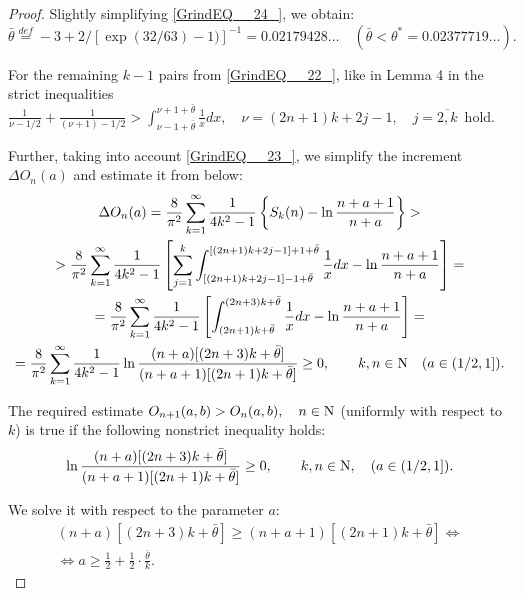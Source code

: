 \documentclass[
11pt,%
tightenlines,%
twoside,%
onecolumn,%
nofloats,%
nobibnotes,%
nofootinbib,%
superscriptaddress,%
noshowpacs,%
centertags]%
{revtex4}
\begin{document}
\begin{proof}
Slightly simplifying \eqref{GrindEQ__24_}, we obtain:
\begin{equation}\label{GrindEQ__25_}
\bar{\theta }\mathop{=}\limits^{def}  - 3 + 2/ [\exp (32/63) -1)]^{-1} = 0.02179428\dots\quad (\bar{\theta } <\theta ^{*} = 0.02377719\dots).
\end{equation}

For the remaining $k-1$ pairs from \eqref{GrindEQ__22_}, like in Lemma 4 in \cite{Sh19} the strict inequalities
$\frac{1}{\nu -1/2} +\frac{1}{(\nu +1)-1/2} > \int _{ \nu -1+ \bar{\theta }}^{\nu +1+\bar{\theta }} \frac{1}{x} dx,\quad \nu =(2n+1)k+2j-1,\quad j=\overline{2, k} \, $ hold.

Further, taking into account \eqref{GrindEQ__23_}, we simplify the increment $\Delta O_{n} (a)$ and estimate it from below:
\begin{multline*}
\Delta O_{n} (a)=  \frac{8}{\pi ^{2} } \sum _{k=1}^{\infty }\frac{1}{4k^{2}  -1}  \left\{S_{k} (n)    -    \ln \frac{n+a+1}{n+a} \right\}   > \\ >
\frac{8}{\pi ^{2} }   \sum _{k=1}^{\infty }\frac{1}{4k^{2}  -  1}   \left[\sum _{j=1}^{k} \int _{ [(2n +1) k +2j-1]  -1 +\bar{\theta }}^{ [(2n +1)k +2j-1] +1+ \bar{\theta }} \frac{1}{x} dx      -   \ln \frac{n+a+1}{n+a} \right]  = \\  = \frac{8}{\pi ^{2} }  \sum _{k=1}^{\infty }\frac{1}{4k^{2}  -  1}   \left[\int _{ (2n +1)k +\bar{\theta }}^{ (2n +3)k  + \bar{\theta }}\frac{1}{x} dx    -   \ln \frac{n+a+1}{n+a} \right]   = \\ =
\frac{8}{\pi ^{2} }  \sum _{k=1}^{\infty }\frac{1}{4k^{2}  -  1}  \ln \frac{(n+a) [(2n+3)k+ \bar{\theta }]}{(n+a+1) [(2n+1)k+  \bar{\theta }]}    \ge   0,    \qquad         k,   n  \in {\rm N}\quad           (a\in (1/2,   1] ) .
\end{multline*}

The required estimate $O_{n +1} (a,  b)   >  O_{n} (a,  b),  \quad     n\in {\rm N}  $ (uniformly with respect to $k$) is true if the following nonstrict inequality holds:
$$
\ln \frac{(n+a)[(2n+3)k+ \bar{\theta }]}{(n+a+1)[(2n+1)k+ \bar{\theta }]}   \ge   0 ,      \qquad      k, n\in {\rm N},   \quad   (a\in (1/2,   1]  ).
$$

We solve it with respect to the parameter $a$:
\begin{gather*}
(n+a)[(2n+3) k  +  \bar{\theta }]   \ge   (n+a+1)[(2n+1) k+  \bar{\theta }]          \Leftrightarrow\\
\Leftrightarrow         a   \ge   \frac{1}{2}   +   \frac{1}{2} \cdot \frac{\bar{\theta }}{k}.
\end{gather*}


\end{proof}
\end{document}
